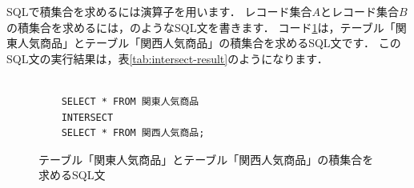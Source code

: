 SQLで積集合を求めるには演算子を用います．
レコード集合$A$とレコード集合$B$の積集合を求めるには，のようなSQL文を書きます．
コード\ref{code:sql-intersect}は，テーブル「関東人気商品」とテーブル「関西人気商品」の積集合を求めるSQL文です．
このSQL文の実行結果は，表\ref{tab:intersect-result}のようになります．
\begin{figure}[!htbp]
    \begin{verbatim}

    SELECT * FROM 関東人気商品
    INTERSECT
    SELECT * FROM 関西人気商品;

    \end{verbatim}
    \captionsetup{name=コード}
    \caption{テーブル「関東人気商品」とテーブル「関西人気商品」の積集合を求めるSQL文}
    \label{code:sql-intersect}
\end{figure}
\begin{table}[!htbp]
    \centering
    \caption{テーブル「関東人気商品」とテーブル「関西人気商品」の積集合を求めるSQL文の実行結果}
    \label{tab:intersect-result}
\end{table}


